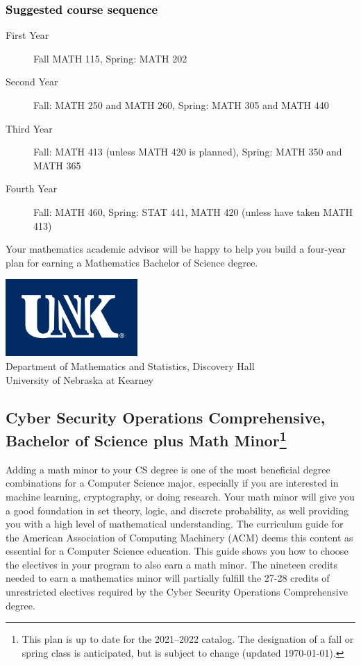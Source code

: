 \documentclass[10pt]{article}
\newenvironment{mypar}[2]
   {\begin{list}{}%
     {\setlength\leftmargin{#1}
     \setlength\rightmargin{#2}}
     \item[]}
   {\end{list}}
\newcommand{\catalog}{2021--2022 }
\newcommand{\myfootnote}{\footnote{This plan is up to date for  the \catalog catalog. The designation of a fall or spring class is 
anticipated, but  is subject to change (updated  \today).}}
\newcommand{\myheading}{
\begin{flushleft}
\includegraphics[scale=0.35]{unk-logo}\\
\setcounter{footnote}{0}
\vspace{0.25in}
 \textcolor{unkblue}{Department of Mathematics and Statistics, Discovery Hall} \\
  \textcolor{unkblue}{University of Nebraska at Kearney}
\end{flushleft}}
\begin{document}
\subsubsection*{\textcolor{black}{Suggested course sequence}}

\begin{description}
   \item[\phantom{xxx} First  Year] Fall MATH 115, Spring: MATH 202
      \item[\phantom{xxx} Second Year]  Fall: MATH 250 and MATH 260,   Spring: MATH 305 and MATH 440
     \item[\phantom{xxx} Third  Year]  Fall: MATH 413 (unless MATH 420 is planned),  Spring: MATH 350 and MATH 365
      \item[\phantom{xxx} Fourth Year]  Fall: MATH 460,  Spring: STAT 441, MATH 420 (unless have taken MATH 413)
 \end{description}

\begin{mypar}{0.5cm}{0.5cm}  Your mathematics academic advisor will be happy to help you build a four-year plan for earning a Mathematics Bachelor of Science degree.

\end{mypar}
\newpage



\myheading

\subsection*{\textbf{\textcolor{unkblue}{Cyber Security Operations Comprehensive, Bachelor of Science plus Math Minor\myfootnote}}}

Adding a math minor to your CS degree is one of the most beneficial degree combinations for a Computer Science major, especially if you are interested in machine learning, cryptography,  or doing research.  Your math minor will give you a good foundation in set theory, logic, and discrete probability, as well providing you with a high level of mathematical understanding. The curriculum guide for the American Association of Computing Machinery (ACM) deems  this content  as essential for  a Computer Science education. This guide shows you how to choose the electives in your program to also earn a math minor. The nineteen  credits needed to earn a mathematics minor will partially fulfill the 27-28  credits of unrestricted electives required by the 
Cyber Security Operations Comprehensive degree.
\end{document}
